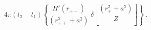 \begin{equation}
4\pi(t_2-t_1)\left\{ \frac{H'(r_{++})}{(r_{++}^2+a^2)}\ \delta
\left[\frac{(r_+^2+a^2)}{Z}\right] \right\}
\ . \label{a}
\end{equation}

